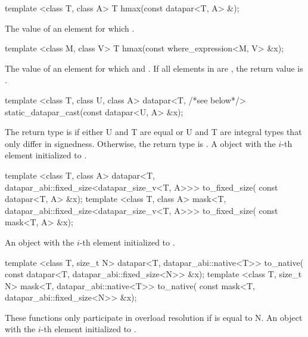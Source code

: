\begin{itemdecl}
template <class T, class A> T hmax(const datapar<T, A> &);
\end{itemdecl}
\begin{itemdescr}
  \pnum\returns The value of an element  for which  \foralli.
\end{itemdescr}

\begin{itemdecl}
template <class M, class V> T hmax(const where_expression<M, V> &x);
\end{itemdecl}
\begin{itemdescr}
  \pnum\returns The value of an element  for which  and  \foralli.
  \pnum\remarks If all elements in  are \false, the return value is .
\end{itemdescr}


\begin{itemdecl}
template <class T, class U, class A>
datapar<T, /*see below*/> static_datapar_cast(const datapar<U, A> &x);
\end{itemdecl}
\begin{itemdescr}
  \pnum\remarks The return type is \datapar[<T, A>] if either \type U and \type T are equal or \type U and \type T are integral types that only differ in signedness.
  Otherwise, the return type is .
  \pnum\returns A \datapar object with the $i$-th element initialized to .
\end{itemdescr}

\begin{itemdecl}
template <class T, class A>
datapar<T, datapar_abi::fixed_size<datapar_size_v<T, A>>> to_fixed_size(
    const datapar<T, A> &x);
template <class T, class A>
mask<T, datapar_abi::fixed_size<datapar_size_v<T, A>>> to_fixed_size(
    const mask<T, A> &x);
\end{itemdecl}
\begin{itemdescr}
  \pnum\returns An object with the $i$-th element initialized to .
\end{itemdescr}

\begin{itemdecl}
template <class T, size_t N>
datapar<T, datapar_abi::native<T>> to_native(
    const datapar<T, datapar_abi::fixed_size<N>> &x);
template <class T, size_t N>
mask<T, datapar_abi::native<T>> to_native(
    const mask<T, datapar_abi::fixed_size<N>> &x);
\end{itemdecl}
\begin{itemdescr}
  \pnum\remarks These functions only participate in overload resolution if  is equal to \code N.
  \pnum\returns An object with the $i$-th element initialized to .
\end{itemdescr}

